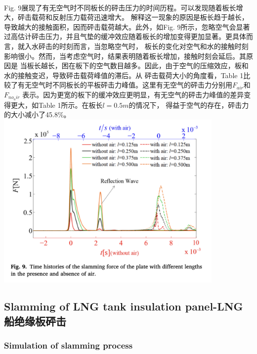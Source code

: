 \documentclass[UTF8]{ctexart}
\begin{document}
\paragraph{\quad}Fig. 9展现了有无空气时不同板长的砰击压力的时间历程。可以发现随着板长增大，砰击载荷和反射压力载荷迅速增大。
                解释这一现象的原因是板长趋于越长，导致越大的接触面积，因而砰击载荷越大。此外，如Fig. 9所示，忽略空气会显著
                过高估计砰击压力，并且气垫的缓冲效应随着板长的增加变得更加显著。更具体而言，就入水砰击的时刻而言，当忽略空气时，
                板长的变化对空气和水的接触时刻影响很小。然而，当考虑空气时，结果表明随着板长增加，接触时刻会延后。其原因是
                当板长越长，困在板下的空气数目越多。因此，由于空气的压缩效应，板和水的接触变迟，导致砰击载荷峰值的滞后。从
                砰击载荷大小的角度看，Table 1比较了有无空气时不同板长的平板砰击力峰值。这里有无空气的砰击力分别用$F_{air}$和$F_{no_air}$
                表示。因为更宽的板下的缓冲效应更明显，有无空气的砰击力峰值的差异变得更大，如Table 1所示。在板长$l = 0.5m$的情况下，
                得益于空气的存在，砰击力的大小减小了45.8\%。\\
{
    \centering
    \includegraphics[width=30em]{./source/Fig9.png}
}

\subsection{Slamming of LNG tank insulation panel-LNG船绝缘板砰击}
\subsubsection{Simulation of slamming process}
\end{document}
